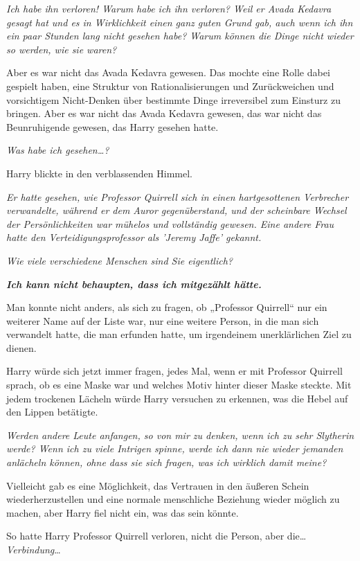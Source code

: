 {\emph{Ich habe ihn verloren! Warum habe ich ihn verloren? Weil er Avada Kedavra gesagt hat und es in Wirklichkeit einen ganz guten Grund gab, auch wenn ich ihn ein paar Stunden lang nicht gesehen habe? Warum können die Dinge nicht wieder so werden, wie sie waren?}

Aber es war nicht das Avada Kedavra gewesen. Das mochte eine Rolle dabei gespielt haben, eine Struktur von Rationalisierungen und Zurückweichen und vorsichtigem Nicht-Denken über bestimmte Dinge irreversibel zum Einsturz zu bringen. Aber es war nicht das Avada Kedavra gewesen, das war nicht das Beunruhigende gewesen, das Harry gesehen hatte.

\emph{Was habe ich gesehen…?}

Harry blickte in den verblassenden Himmel.

\emph{Er hatte gesehen, wie Professor Quirrell sich in einen hartgesottenen Verbrecher verwandelte, während er dem Auror gegenüberstand, und der scheinbare Wechsel der Persönlichkeiten war mühelos und vollständig gewesen. Eine andere Frau hatte den Verteidigungsprofessor als 'Jeremy Jaffe' gekannt.}

\emph{Wie viele verschiedene Menschen sind Sie eigentlich?}

\emph{\textbf{Ich kann nicht behaupten, dass ich mitgezählt hätte.}}

Man konnte nicht anders, als sich zu fragen, ob „Professor Quirrell“ nur ein weiterer Name auf der Liste war, nur eine weitere Person, in die man sich verwandelt hatte, die man erfunden hatte, um irgendeinem unerklärlichen Ziel zu dienen.

Harry würde sich jetzt immer fragen, jedes Mal, wenn er mit Professor Quirrell sprach, ob es eine Maske war und welches Motiv hinter dieser Maske steckte. Mit jedem trockenen Lächeln würde Harry versuchen zu erkennen, was die Hebel auf den Lippen betätigte.

\emph{Werden andere Leute anfangen, so von mir zu denken, wenn ich zu sehr Slytherin werde? Wenn ich zu viele Intrigen spinne, werde ich dann nie wieder jemanden anlächeln können, ohne dass sie sich fragen, was ich wirklich damit meine?}

Vielleicht gab es eine Möglichkeit, das Vertrauen in den äußeren Schein wiederherzustellen und eine normale menschliche Beziehung wieder möglich zu machen, aber Harry fiel nicht ein, was das sein könnte.

So hatte Harry Professor Quirrell verloren, nicht die Person, aber die… \emph{Verbindung}…

}
